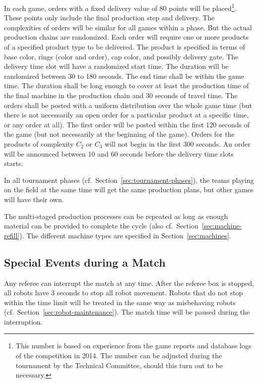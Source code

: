 \documentclass[12pt,twoside]{article}
\newcommand{\refsec}[1]{Section~\ref{#1}}
\begin{document}
In each game, orders with a fixed delivery value of 80 points will be
placed\footnote{This number is based on experience from the game
  reports and database logs of the competition in 2014. The number can
  be adjusted during the tournament by the Technical Committee, should
  this turn out to be necessary.}. These points only include the final
production step and delivery. The complexities of orders will be
similar for all games within a phase. But the actual production chains
are randomized. Each order will require one or more products of a
specified product type to be delivered. The product is specified in
terms of base color, rings (color and order), cap color, and possibly
delivery gate. The delivery time slot will have a randomized start
time. The duration will be randomized between 30 to 180 seconds. The
end time shall be within the game time. The duration shall be long
enough to cover at least the production time of the final machine in
the production chain and 30 seconds of travel time. The orders shall
be posted with a uniform distribution over the whole game time (but
there is not necessarily an open order for a particular product at a
specific time, or any order at all). The first order will be posted
within the first 120 seconds of the game (but not necessarily at the
beginning of the game). Orders for the products of complexity $C_2$ or
$C_3$ will not begin in the first 300 seconds. An order will be
announced between 10 and 60 seconds before the delivery time slots
starts.

In all tournament phases (cf.~\refsec{sec:tournament-phases}), the
teams playing on the field at the same time will get the same
production plans, but other games will have their own.

The multi-staged production processes can be repeated as long as
enough material can be provided to complete the cycle (also
cf.~\refsec{sec:machine-refill}). The different machine types are
specified in Section~\ref{sec:machines}.

\subsection{Special Events during a Match}
\label{sec:during-match}
Any referee can interrupt the match at any time. After the referee box
is stopped, all robots have 3 seconds to stop all robot movement.
Robots that do not stop within the time limit will be treated in the
same way as misbehaving robots (cf.~\refsec{sec:robot-maintenance}).
The match time will be paused during the interruption.
\end{document}
